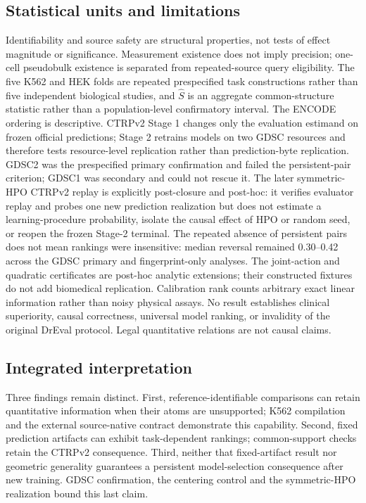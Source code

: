 \documentclass[11pt]{article}
\begin{document}
\subsection{Statistical units and limitations}
Identifiability and source safety are structural properties, not tests of effect magnitude or significance. Measurement existence does not imply precision; one-cell pseudobulk existence is separated from repeated-source query eligibility. The five K562 and HEK folds are repeated prespecified task constructions rather than five independent biological studies, and $\widehat S$ is an aggregate common-structure statistic rather than a population-level confirmatory interval. The ENCODE ordering is descriptive. CTRPv2 Stage 1 changes only the evaluation estimand on frozen official predictions; Stage 2 retrains models on two GDSC resources and therefore tests resource-level replication rather than prediction-byte replication. GDSC2 was the prespecified primary confirmation and failed the persistent-pair criterion; GDSC1 was secondary and could not rescue it. The later symmetric-HPO CTRPv2 replay is explicitly post-closure and post-hoc: it verifies evaluator replay and probes one new prediction realization but does not estimate a learning-procedure probability, isolate the causal effect of HPO or random seed, or reopen the frozen Stage-2 terminal. The repeated absence of persistent pairs does not mean rankings were insensitive: median reversal remained 0.30--0.42 across the GDSC primary and fingerprint-only analyses. The joint-action and quadratic certificates are post-hoc analytic extensions; their constructed fixtures do not add biomedical replication. Calibration rank counts arbitrary exact linear information rather than noisy physical assays. No result establishes clinical superiority, causal correctness, universal model ranking, or invalidity of the original DrEval protocol. Legal quantitative relations are not causal claims.


\subsection{Integrated interpretation}
Three findings remain distinct. First, reference-identifiable comparisons can retain quantitative information when their atoms are unsupported; K562 compilation and the external source-native contract demonstrate this capability. Second, fixed prediction artifacts can exhibit task-dependent rankings; common-support checks retain the CTRPv2 consequence. Third, neither that fixed-artifact result nor geometric generality guarantees a persistent model-selection consequence after new training. GDSC confirmation, the centering control and the symmetric-HPO realization bound this last claim.
\end{document}
